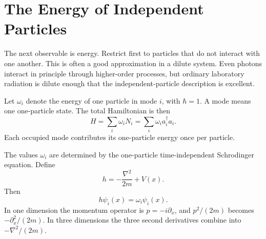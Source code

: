 \begin{classroomqa}
\end{classroomqa}

\section{The Energy of Independent Particles}

The next observable is energy. Restrict first to particles that do not interact with one another. This is often a good approximation in a dilute system. Even photons interact in principle through higher-order processes, but ordinary laboratory radiation is dilute enough that the independent-particle description is excellent.

Let \(\omega_i\) denote the energy of one particle in mode \(i\), with \(\hbar=1\). A mode means one one-particle state. The total Hamiltonian is then
\begin{equation}
H=\sum_i\omega_i N_i
=\sum_i\omega_i a_i^\dagger a_i.
\label{eq:l07-mode-hamiltonian}
\end{equation}
Each occupied mode contributes its one-particle energy once per particle.

\begin{classroomqa}
\end{classroomqa}

The values \(\omega_i\) are determined by the one-particle time-independent Schrodinger equation. Define
\begin{equation}
h=-\frac{\nabla^2}{2m}+V(x).
\label{eq:l07-one-particle-h}
\end{equation}
Then
\begin{equation}
h\psi_i(x)=\omega_i\psi_i(x).
\label{eq:l07-schrodinger-eigenvalue}
\end{equation}
In one dimension the momentum operator is \(p=-i\partial_x\), and \(p^2/(2m)\) becomes \(-\partial_x^2/(2m)\). In three dimensions the three second derivatives combine into \(-\nabla^2/(2m)\).

